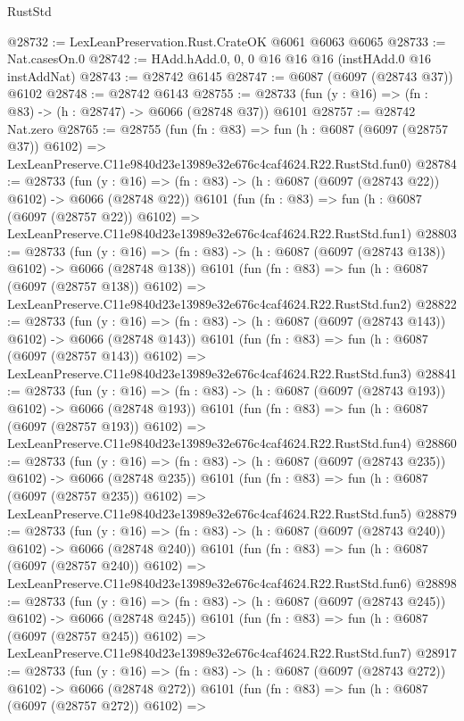 \begin{lexlean}{RustStd}
\begin{coremodule}
@28732 := LexLeanPreservation.Rust.CrateOK @6061 @6063 @6065
@28733 := Nat.casesOn.{0}
@28742 := HAdd.hAdd.{0, 0, 0} @16 @16 @16 (instHAdd.{0} @16 instAddNat)
@28743 := @28742 @6145
@28747 := @6087 (@6097 (@28743 @37)) @6102
@28748 := @28742 @6143
@28755 := @28733 (fun (y : @16) => (fn : @83) -> (h : @28747) -> @6066 (@28748 @37)) @6101
@28757 := @28742 Nat.zero
@28765 := @28755
    (fun (fn : @83) =>
    fun (h : @6087 (@6097 (@28757 @37)) @6102) =>
    LexLeanPreserve.C11e9840d23e13989e32e676c4caf4624.R22.RustStd.fun0)
@28784 := @28733
    (fun (y : @16) => (fn : @83) -> (h : @6087 (@6097 (@28743 @22)) @6102) -> @6066 (@28748 @22))
    @6101
    (fun (fn : @83) =>
    fun (h : @6087 (@6097 (@28757 @22)) @6102) =>
    LexLeanPreserve.C11e9840d23e13989e32e676c4caf4624.R22.RustStd.fun1)
@28803 := @28733
    (fun (y : @16) => (fn : @83) -> (h : @6087 (@6097 (@28743 @138)) @6102) -> @6066 (@28748 @138))
    @6101
    (fun (fn : @83) =>
    fun (h : @6087 (@6097 (@28757 @138)) @6102) =>
    LexLeanPreserve.C11e9840d23e13989e32e676c4caf4624.R22.RustStd.fun2)
@28822 := @28733
    (fun (y : @16) => (fn : @83) -> (h : @6087 (@6097 (@28743 @143)) @6102) -> @6066 (@28748 @143))
    @6101
    (fun (fn : @83) =>
    fun (h : @6087 (@6097 (@28757 @143)) @6102) =>
    LexLeanPreserve.C11e9840d23e13989e32e676c4caf4624.R22.RustStd.fun3)
@28841 := @28733
    (fun (y : @16) => (fn : @83) -> (h : @6087 (@6097 (@28743 @193)) @6102) -> @6066 (@28748 @193))
    @6101
    (fun (fn : @83) =>
    fun (h : @6087 (@6097 (@28757 @193)) @6102) =>
    LexLeanPreserve.C11e9840d23e13989e32e676c4caf4624.R22.RustStd.fun4)
@28860 := @28733
    (fun (y : @16) => (fn : @83) -> (h : @6087 (@6097 (@28743 @235)) @6102) -> @6066 (@28748 @235))
    @6101
    (fun (fn : @83) =>
    fun (h : @6087 (@6097 (@28757 @235)) @6102) =>
    LexLeanPreserve.C11e9840d23e13989e32e676c4caf4624.R22.RustStd.fun5)
@28879 := @28733
    (fun (y : @16) => (fn : @83) -> (h : @6087 (@6097 (@28743 @240)) @6102) -> @6066 (@28748 @240))
    @6101
    (fun (fn : @83) =>
    fun (h : @6087 (@6097 (@28757 @240)) @6102) =>
    LexLeanPreserve.C11e9840d23e13989e32e676c4caf4624.R22.RustStd.fun6)
@28898 := @28733
    (fun (y : @16) => (fn : @83) -> (h : @6087 (@6097 (@28743 @245)) @6102) -> @6066 (@28748 @245))
    @6101
    (fun (fn : @83) =>
    fun (h : @6087 (@6097 (@28757 @245)) @6102) =>
    LexLeanPreserve.C11e9840d23e13989e32e676c4caf4624.R22.RustStd.fun7)
@28917 := @28733
    (fun (y : @16) => (fn : @83) -> (h : @6087 (@6097 (@28743 @272)) @6102) -> @6066 (@28748 @272))
    @6101
    (fun (fn : @83) =>
    fun (h : @6087 (@6097 (@28757 @272)) @6102) =>

\end{coremodule}
\end{lexlean}
